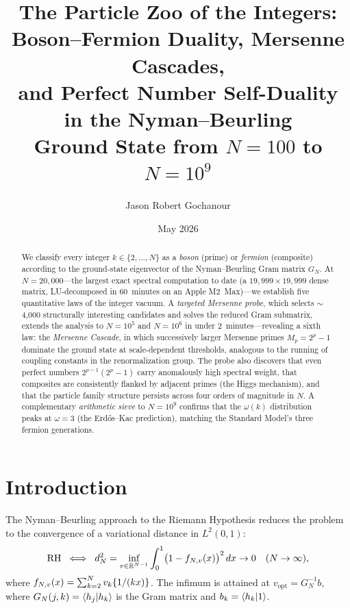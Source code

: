 \documentclass[11pt,a4paper]{article}
\title{%
  The Particle Zoo of the Integers:\\
  Boson--Fermion Duality, Mersenne Cascades,\\
  and Perfect Number Self-Duality in the Nyman--Beurling\\
  Ground State from $N = 100$ to $N = 10^9$%
}
\author{
  Jason Robert Gochanour
}
\date{May 2026}
\begin{document}
\maketitle

\begin{abstract}
We classify every integer $k \in \{2, \ldots, N\}$ as a \emph{boson} (prime)
or \emph{fermion} (composite) according to the ground-state eigenvector of
the Nyman--Beurling Gram matrix $G_N$. At $N = 20{,}000$---the largest
exact spectral computation to date (a $19{,}999 \times 19{,}999$ dense
matrix, LU-decomposed in 60~minutes on an Apple M2~Max)---we establish
five quantitative laws of the integer vacuum.
A \emph{targeted Mersenne probe}, which selects $\sim$4{,}000 structurally
interesting candidates and solves the reduced Gram submatrix, extends
the analysis to $N = 10^5$ and $N = 10^6$ in under 2~minutes---revealing
a sixth law: the \emph{Mersenne Cascade}, in which successively larger
Mersenne primes $M_p = 2^p - 1$ dominate the ground state at
scale-dependent thresholds, analogous to the running of coupling
constants in the renormalization group.
The probe also discovers that even perfect numbers
$2^{p-1}(2^p-1)$ carry anomalously high spectral weight, that
composites are consistently flanked by adjacent primes (the Higgs
mechanism), and that the particle family structure persists across
four orders of magnitude in $N$.
A complementary \emph{arithmetic sieve} to $N = 10^9$ confirms that the
$\omega(k)$ distribution peaks at $\omega = 3$ (the Erd\H{o}s--Kac
prediction), matching the Standard Model's three fermion generations.
\end{abstract}

\section{Introduction}

The Nyman--Beurling approach to the Riemann Hypothesis reduces the problem
to the convergence of a variational distance in $L^2(0,1)$:
\begin{equation}\label{eq:nb}
  \mathrm{RH} \;\iff\;
  d_N^2 = \inf_{v \in \mathbb{R}^{N-1}} \int_0^1 \bigl(1 - f_{N,v}(x)\bigr)^2\,dx
  \to 0 \quad (N \to \infty),
\end{equation}
where $f_{N,v}(x) = \sum_{k=2}^{N} v_k \{1/(kx)\}$.
The infimum is attained at $v_{\mathrm{opt}} = G_N^{-1} b$,
where $G_N(j,k) = \langle h_j | h_k \rangle$ is the Gram matrix and
$b_k = \langle h_k | 1 \rangle$.
\end{document}
